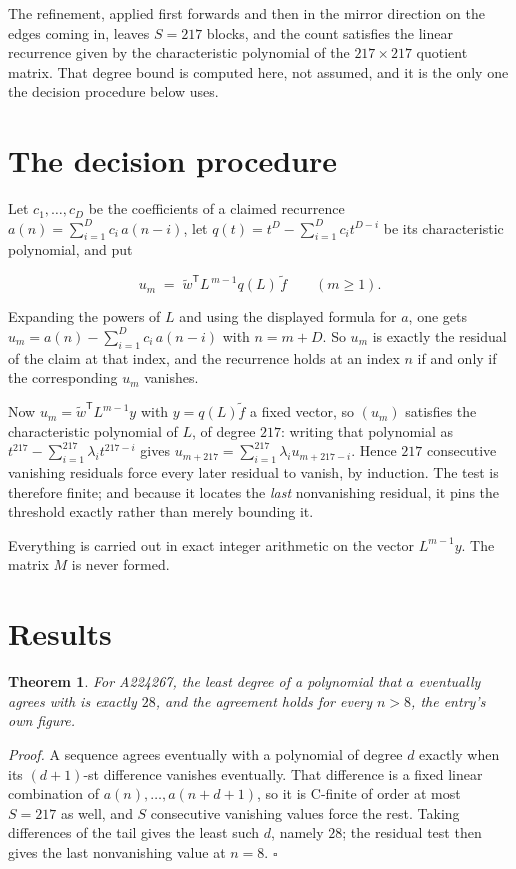 \documentclass[11pt]{article}
\newtheorem{theorem}{Theorem}
\theoremstyle{definition}
\begin{document}
The refinement, applied first forwards and then in the mirror direction on the edges coming in, leaves $S = 217$ blocks, and the count satisfies the linear recurrence given by the characteristic polynomial of the $217 \times 217$ quotient matrix. That degree bound is computed here, not assumed, and it is the only one the decision procedure below uses.

\section{The decision procedure}

Let $c_1,\dots,c_D$ be the coefficients of a claimed recurrence $a(n) = \sum_{i=1}^{D} c_i\,a(n-i)$, let $q(t) = t^{D} - \sum_{i=1}^{D} c_i t^{D-i}$ be its characteristic polynomial, and put

\[u_m \;=\; \tilde w^{\mathsf T} L^{\,m-1} q(L)\,\tilde f \qquad (m \ge 1).\]

Expanding the powers of $L$ and using the displayed formula for $a$, one gets $u_m = a(n) - \sum_{i=1}^{D} c_i\,a(n-i)$ with $n = m + D$. So $u_m$ is exactly the residual of the claim at that index, and the recurrence holds at an index $n$ if and only if the corresponding $u_m$ vanishes.

Now $u_m = \tilde w^{\mathsf T} L^{m-1} y$ with $y = q(L)\tilde f$ a fixed vector, so $(u_m)$ satisfies the characteristic polynomial of $L$, of degree $217$: writing that polynomial as $t^{217} - \sum_{i=1}^{217} \lambda_i t^{217-i}$ gives $u_{m+217} = \sum_{i=1}^{217} \lambda_i u_{m+217-i}$. Hence $217$ consecutive vanishing residuals force every later residual to vanish, by induction. The test is therefore finite; and because it locates the {\itshape last} nonvanishing residual, it pins the threshold exactly rather than merely bounding it.

Everything is carried out in exact integer arithmetic on the vector $L^{m-1}y$. The matrix $M$ is never formed.

\section{Results}

\begin{theorem} For A224267, the least degree of a polynomial that $a$ eventually agrees with is exactly $28$, and the agreement holds for every $n > 8$, the entry's own figure.\end{theorem}

{\itshape Proof.} A sequence agrees eventually with a polynomial of degree $d$ exactly when its $(d+1)$-st difference vanishes eventually. That difference is a fixed linear combination of $a(n),\dots,a(n+d+1)$, so it is C-finite of order at most $S = 217$ as well, and $S$ consecutive vanishing values force the rest. Taking differences of the tail gives the least such $d$, namely $28$; the residual test then gives the last nonvanishing value at $n = 8$. $\square$
\end{document}
